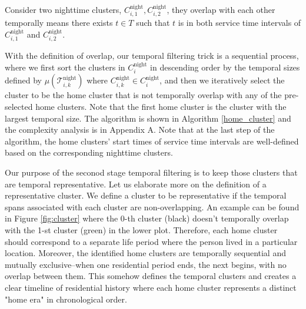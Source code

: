 \begin{definition}
Consider two nighttime clusters, $C^{\text{night}}_{i, 1}, C^{\text{night}}_{i, 2}$, they overlap with each other temporally means there exists $t \in T$ such that $t$ is in both service time intervals of $C^{\text{night}}_{i, 1}$ and $C^{\text{night}}_{i, 2}$.
\end{definition}

With the definition of overlap, our temporal filtering trick is a sequential process, where we first sort the clusters in $C^{\text{night}}_i$ in descending order by the temporal sizes defined by $\mu(\mathcal{T}^{\text{night}}_{i, k})$ where $C^{\text{night}}_{i, k} \in C^{\text{night}}_i$, and then we iteratively select the cluster to be the home cluster that is not temporally overlap with any of the pre-selected home clusters. Note that the first home cluster is the cluster with the largest temporal size. The algorithm is shown in Algorithm \ref{home_cluster} and the complexity analysis is in Appendix A. Note that at the last step of the algorithm, the home clusters' start times of service time intervals are well-defined based on the corresponding nighttime clusters.

Our purpose of the seconod stage temporal filtering is to keep those clusters that are temporal representative. Let us elaborate more on the definition of a representative cluster. We define a cluster to be representative if the temporal spans associated with each cluster are non-overlapping. An example can be found in Figure \ref{fig:cluster} where the 0-th cluster (black) doesn't temporally overlap with the 1-st cluster (green) in the lower plot. Therefore, each home cluster should correspond to a separate life period where the person lived in a particular location. Moreover, the identified home clusters are temporally sequential and mutually exclusive--when one residential period ends, the next begins, with no overlap between them. This somehow defines the temporal clusters and creates a clear timeline of residential history where each home cluster represents a distinct "home era" in chronological order.


